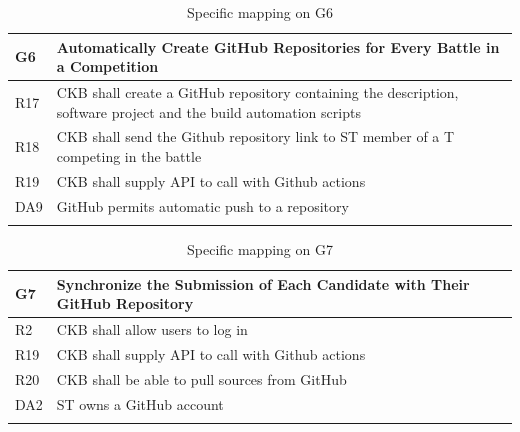   \begin{longtable}{|l|p{12cm}|}
    \hline
    \textbf{G6} & \textbf{Automatically Create GitHub Repositories for Every Battle in a Competition}      \\
    \hline
    R17 & CKB shall create a GitHub repository containing the description, software project and the build automation scripts \\
    \hline
    R18 & CKB shall send the Github repository link to ST member of a T competing in the battle \\
    \hline
    R19 & CKB shall supply API to call with Github actions \\
    \hline
    DA9 & GitHub permits automatic push to a repository \\
    \hline

    \caption{Specific mapping on G6}
    \label{tab:mappingG6}
  \end{longtable}
  
  \begin{longtable}{|l|p{12cm}|}
    \hline
    \textbf{G7} & \textbf{Synchronize the Submission of Each Candidate with Their GitHub Repository}      \\
    \hline
    R2 & CKB shall allow users to log in \\
    \hline
    R19 & CKB shall supply API to call with Github actions \\
    \hline
    R20 & CKB shall be able to pull sources from GitHub \\
    \hline
    DA2 & ST owns a GitHub account \\
    \hline

    \caption{Specific mapping on G7}
    \label{tab:mappingG7}
  \end{longtable}


